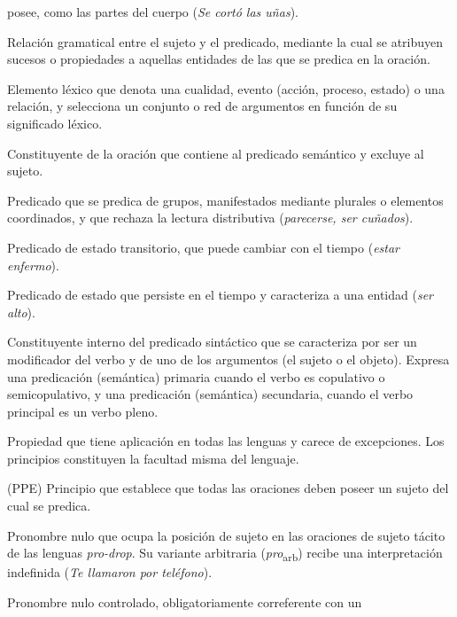 \begin{glosariogeneral}
        posee, como las partes del cuerpo (\textit{Se cortó las uñas}).
  \item[Predicación:] Relación gramatical entre el sujeto y el predicado,
        mediante la cual se atribuyen sucesos o propiedades a aquellas
        entidades de las que se predica en la oración.
  \item[Predicado (semántico):] Elemento léxico que denota una cualidad, evento
        (acción, proceso, estado) o una relación, y selecciona un conjunto o
        red de argumentos en función de su significado léxico.
  \item[Predicado sintáctico:] Constituyente de la oración que contiene al
        predicado semántico y excluye al sujeto.
  \item[Predicado simétrico o colectivo:] Predicado que se predica de grupos,
        manifestados mediante plurales o elementos coordinados, y que rechaza la
        lectura distributiva (\textit{parecerse, ser cuñados}).
  \item[Predicado de estadio:] Predicado de estado transitorio, que puede
        cambiar con el tiempo (\textit{estar enfermo}).
  \item[Predicado de nivel individual:] Predicado de estado que persiste en el
        tiempo y caracteriza a una entidad (\textit{ser alto}).
  \item[Predicativo:] Constituyente interno del predicado sintáctico que se
        caracteriza por ser un modificador del verbo y de uno de los argumentos
        (el sujeto o el objeto). Expresa una predicación (semántica) primaria
        cuando el verbo es copulativo o semicopulativo, y una predicación
        (semántica) secundaria, cuando el verbo principal es un verbo pleno.
  \item[Principio:] Propiedad que tiene aplicación en todas las lenguas y carece
        de excepciones. Los principios constituyen la facultad misma del
        lenguaje.
  \item[Principio de proyección extendida:] (PPE) Principio que establece que
        todas las oraciones deben poseer un sujeto del cual se predica.
  \item[\textit{pro}:] Pronombre nulo que ocupa la posición de sujeto en las
        oraciones de sujeto tácito de las lenguas \textit{pro-drop}. Su
        variante arbitraria (\textit{pro}\textsubscript{arb}) recibe una
        interpretación indefinida (\textit{Te llamaron por teléfono}).
  \item[PRO:] Pronombre nulo controlado, obligatoriamente correferente con un

\end{glosariogeneral}
